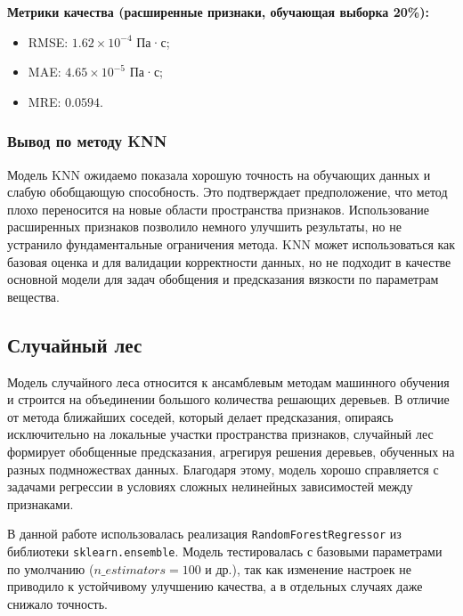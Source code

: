 \documentclass[a4paper,12pt]{article}
\begin{document}
      \begin{minipage}{\textwidth}
        \textbf{Метрики качества (расширенные признаки, обучающая выборка 20\%):}
        \begin{itemize}
          \item RMSE: \( 1.62 \times 10^{-4} \) Па·с;
          \item MAE: \( 4.65 \times 10^{-5} \) Па·с;
          \item MRE: \( 0.0594 \).
        \end{itemize}
      \end{minipage}

    \subsubsection{Вывод по методу KNN}

      Модель KNN ожидаемо показала хорошую точность на обучающих данных и слабую обобщающую способность. Это подтверждает предположение, что метод плохо переносится на новые области пространства признаков. Использование расширенных признаков позволило немного улучшить результаты, но не устранило фундаментальные ограничения метода. KNN может использоваться как базовая оценка и для валидации корректности данных, но не подходит в качестве основной модели для задач обобщения и предсказания вязкости по параметрам вещества.


  \subsection{Случайный лес}

    Модель случайного леса относится к ансамблевым методам машинного обучения и строится на объединении большого количества решающих деревьев. В отличие от метода ближайших соседей, который делает предсказания, опираясь исключительно на локальные участки пространства признаков, случайный лес формирует обобщенные предсказания, агрегируя решения деревьев, обученных на разных подмножествах данных. Благодаря этому, модель хорошо справляется с задачами регрессии в условиях сложных нелинейных зависимостей между признаками.
    
    В данной работе использовалась реализация \texttt{RandomForestRegressor} из библиотеки \texttt{sklearn.ensemble}. Модель тестировалась с базовыми параметрами по умолчанию (\( n\_estimators = 100 \) и др.), так как изменение настроек не приводило к устойчивому улучшению качества, а в отдельных случаях даже снижало точность.
    
\end{document}

